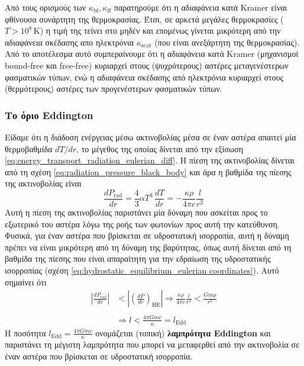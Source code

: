 Από τους ορισμούς των $\kappa_{\text{bf}}, \kappa_{\text{ff}}$ παρατηρούμε ότι η αδιαφάνεια κατά Kramer είναι φθίνουσα συνάρτητη της θερμοκρασίας. Έτσι, σε αρκετά μεγάλες θερμοκρασίες ($T > 10^8 \,\text{K}$) η τιμή της τείνει στο μηδέν και επομένως γίνεται μικρότερη από την αδιαφάνεια σκέδασης απο ηλεκτρόνια $\kappa_{\text{scat}}$ (που είναι ανεξάρτητη της θερμοκρασίας). Από το αποτέλεσμα αυτό συμπεραίνουμε ότι η αδιαφάνεια κατά Kramer (μηχανισμοί bound-free και free-free) κυριαρχεί στους (ψυχρότερους) αστέρες μεταγενέστερων φασματικών τύπων, ενώ η αδιαφάνεια σκέδασης από ηλεκτρόνια κυριαρχεί στους (θερμότερους) αστέρες των προγενέστερων φασματικών τύπων.
\subsubsection{Το όριο Eddington}
Είδαμε ότι η διάδοση ενέργειας μέσω ακτινοβολίας μέσα σε έναν αστέρα απαιτεί μία θερμοβαθμίδα $dT/dr$, το μέγεθος της οποίας δίνεται από την εξίσωση \eqref{eq:energy_transport_radiation_eulerian_diff}. Η πίεση της ακτινοβολίας δίνεται από τη σχέση \eqref{eq:radiation_pressure_black_body} και άρα η βαθμίδα της πίεσης της ακτινοβολίας είναι
\begin{equation}
    \label{eq:radiation_pressure_gradient}
    \frac{dP_{\text{rad}}}{dr} = \frac{4}{3} \alpha T^3 \,\frac{dT}{dr} = - \frac{\kappa \rho}{4\pi c} \frac{l}{r^2}
\end{equation}
Αυτή η πίεση της ακτινοβολίας παριστάνει μία δύναμη που ασκείται προς το εξωτερικό του αστέρα λόγω της ροής των φωτονίων προς αυτή την κατεύθυνση. Φυσικά, για έναν αστέρα που βρίσκεται σε υδροστατική ισορροπία, αυτή η δύναμη πρέπει να είναι μικρότερη από τη δύναμη της βαρύτητας, όπως αυτή δίνεται από τη βαθμίδα της πίεσης που είναι απαραίτητη για την εδραίωση της υδροστατικής ισορροπίας (σχέση \ref{eq:hydrostatic_equilibrium_eulerian coordinates}). Αυτό σημαίνει ότι
\begin{align}
    \label{eq:eddington_limit}
    \nonumber \left| \frac{dP_{\text{rad}}}{dr} \right| &< \left| \left( \frac{dP}{dr} \right)_{\text{HE}} \right| \Rightarrow \frac{\kappa \rho}{4 \pi c} \frac{l}{r^2} < \frac{G m \rho}{r^2} \\ \nonumber \\
    &\Rightarrow l < \frac{4\pi G m c}{\kappa} = l_{\text{Edd}}
\end{align}
Η ποσότητα $l_{\text{Edd}} = \frac{4\pi G m c}{\kappa}$ ονομάζεται (τοπική) \textbf{λαμπρότητα Eddington} και παριστάνει τη μέγιστη λαμπρότητα που μπορεί να μεταφερθεί από την ακτινοβολία σε έναν αστέρα που βρίσκεται σε υδροστατική ισορροπία.

